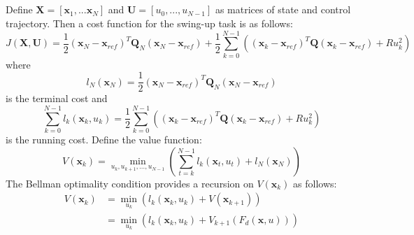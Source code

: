 \subsection{}
Define $\mathbf{X} = [\mathbf{x}_1, ... \mathbf{x}_N]$ and $ \mathbf{U} = [u_0,...,u_{N-1}]$ as matrices of state and control trajectory. Then a cost function for the swing-up task is as follows:
\begin{equation}
    J(\mathbf{X},\mathbf{U}) = \frac{1}{2} (\mathbf{x}_N -\mathbf{x}_{ref})^T\mathbf{Q}_N (\mathbf{x}_N -\mathbf{x}_{ref}) + \frac{1}{2}\sum_{k = 0}^{N-1}\left((\mathbf{x}_k -\mathbf{x}_{ref})^T \mathbf{Q} (\mathbf{x}_k -\mathbf{x}_{ref}) + Ru_k^2 \right)
\end{equation}
where
\begin{equation}
    l_N({\mathbf{x}_N}) = \frac{1}{2} (\mathbf{x}_N -\mathbf{x}_{ref})^T\mathbf{Q}_N (\mathbf{x}_N -\mathbf{x}_{ref})
\end{equation}
is the terminal cost and 
\begin{equation}
    \sum_{k = 0}^{N-1}l_k (\mathbf{x}_k, u_k)  = \frac{1}{2}\sum_{k = 0}^{N-1}\left((\mathbf{x}_k -\mathbf{x}_{ref})^T \mathbf{Q} (\mathbf{x}_k -\mathbf{x}_{ref}) + Ru_k^2 \right)
\end{equation}
is the running cost. Define the value function:
\begin{equation}
    V(\mathbf{x}_k) = \min_{u_k,u_{k+1}, \ldots , u_{N-1}}\left(\sum_{t = k}^{N-1}l_k (\mathbf{x}_t, u_t) +   l_N(\mathbf{x}_N) \right)
\end{equation}
The Bellman optimality condition provides a recursion on $V(\mathbf{x}_k)$ as follows:
\begin{align}
    V(\mathbf{x}_k)  &= \min_{u_k}\left(l_k(\mathbf{x}_k,u_k) + V(\mathbf{x}_{k+1})\right)\\
    &= \min_{u_k}\left(l_k(\mathbf{x}_k,u_k) + V_{k+1}(F_d(\mathbf{x}, u))\right)
\end{align}
